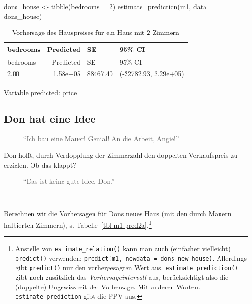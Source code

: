 \documentclass[
  a4paper,
  DIV=11]{scrreprt}
\newenvironment{Shaded}{\begin{snugshade}}{\end{snugshade}}
\newcommand{\AttributeTok}[1]{\textcolor[rgb]{0.40,0.45,0.13}{#1}}
\newcommand{\DecValTok}[1]{\textcolor[rgb]{0.68,0.00,0.00}{#1}}
\newcommand{\FunctionTok}[1]{\textcolor[rgb]{0.28,0.35,0.67}{#1}}
\newcommand{\NormalTok}[1]{\textcolor[rgb]{0.00,0.23,0.31}{#1}}
\newcommand{\OtherTok}[1]{\textcolor[rgb]{0.00,0.23,0.31}{#1}}
\theoremstyle{definition}
\theoremstyle{remark}
\begin{document}
\begin{Shaded}
\begin{Highlighting}[]
\NormalTok{dons\_house }\OtherTok{\textless{}{-}} \FunctionTok{tibble}\NormalTok{(}\AttributeTok{bedrooms =} \DecValTok{2}\NormalTok{)}
\FunctionTok{estimate\_prediction}\NormalTok{(m1, }\AttributeTok{data =}\NormalTok{ dons\_house)}
\end{Highlighting}
\end{Shaded}

\hypertarget{tbl-m1-pred}{}
\begin{longtable}[]{@{}lrll@{}}
\caption{\label{tbl-m1-pred}Vorhersage des Hauspreises für ein Haus mit
2 Zimmern}\tabularnewline
\toprule()
bedrooms & Predicted & SE & 95\% CI \\
\midrule()
\endfirsthead
\toprule()
bedrooms & Predicted & SE & 95\% CI \\
\midrule()
\endhead
2.00 & 1.58e+05 & 88467.40 & (-22782.93, 3.29e+05) \\
\bottomrule()
\end{longtable}

Variable predicted: price

\hypertarget{don-hat-eine-idee}{%
\subsection{Don hat eine Idee}\label{don-hat-eine-idee}}

\begin{quote}
``Ich bau eine Mauer! Genial! An die Arbeit, Angie!'' 🧑
\end{quote}

Don hofft, durch Verdopplung der Zimmerzahl den doppelten Verkaufspreis
zu erzielen. Ob das klappt?

\begin{quote}
``Das ist keine gute Idee, Don.''
\end{quote}

👩

Berechnen wir die Vorhersagen für Dons neues Haus (mit den durch Mauern
halbierten Zimmern), s. Tabelle~\ref{tbl-m1-pred2a}.\footnote{Anstelle
  von \texttt{estimate\_relation()} kann man auch (einfacher vielleicht)
  \texttt{predict()} verwenden:
  \texttt{predict(m1,\ newdata\ =\ dons\_new\_house)}. Allerdings gibt
  \texttt{predict()} nur den vorhergesagten Wert aus.
  \texttt{estimate\_prediction()} gibt noch zusätzlich das
  \emph{Vorhersageintervall} aus, berücksichtigt also die (doppelte)
  Ungewissheit der Vorhersage. Mit anderen Worten:
  \texttt{estimate\_prediction} gibt die PPV aus.}
\end{document}
